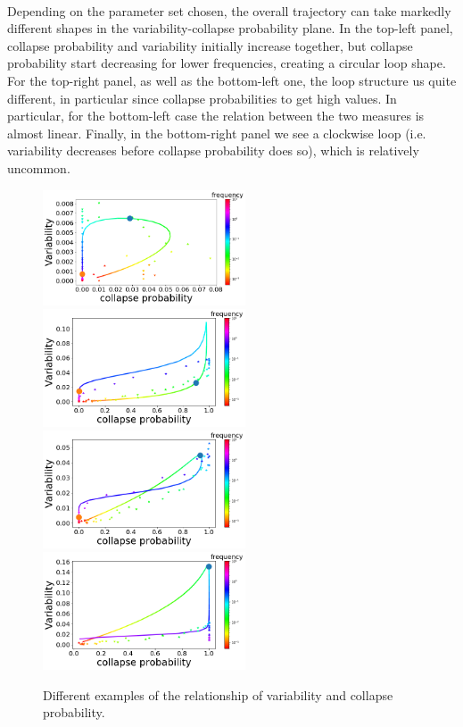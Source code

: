 \documentclass{article}
\begin{document}
\paragraph{}
Depending on the parameter set chosen, the overall trajectory can take markedly different shapes in the variability-collapse probability plane. In the top-left panel, collapse probability and variability initially increase together, but collapse probability start decreasing for lower frequencies, creating a circular loop shape. For the top-right panel, as well as the bottom-left one, the loop structure us quite different, in particular since collapse probabilities to get high values. In particular, for the bottom-left case the relation between the two measures is almost linear. Finally, in the bottom-right panel we see a clockwise loop (i.e. variability decreases before collapse probability does so), which is relatively uncommon.

\begin{figure}[h!]
\begin{center}
\includegraphics[width=6cm]{case_circle.png}
\includegraphics[width=6cm]{case_triangular.png}
\includegraphics[width=6cm]{case_linear.png}
\includegraphics[width=6cm]{case_clockwise.png}
\end{center}
\caption{Different examples of the relationship of variability and collapse probability. %
\label{fig:loops}}
\end{figure}
\end{document}

